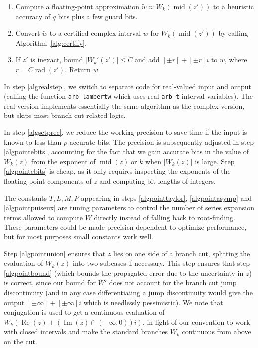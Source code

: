 \documentclass[11pt,a4paper]{article}
\begin{document}
\begin{algorithm}[h!]
\begin{enumerate}
\item Compute a floating-point approximation $\tilde w \approx W_k(\operatorname{mid}(z'))$ to a heuristic accuracy of $q$ bits plus a few guard bits.

\item Convert $\tilde w$ to a certified complex interval $w$ for $W_k(\operatorname{mid}(z'))$ by calling Algorithm~\ref{alg:certify}.

\item \label{algpointbound} If $z'$ is inexact, bound $|W_k'(z')| \le C$ and add $[\pm r] + [\pm r] i$ to $w$, where $r = C \operatorname{rad}(z')$. Return $w$.
\end{enumerate}
\label{alg:main}
\end{algorithm}

In step \ref{algrealstep}, we switch to separate code for real-valued
input and output (calling
the function \texttt{arb\_lambertw} which uses real \texttt{arb\_t}
interval variables).
The real version implements essentially the same algorithm
as the complex version,
but skips most branch cut related logic.

In step \ref{algsetprec}, we reduce the working precision
to save time if the input is known to less than $p$ accurate bits.
The precision is subsequently adjusted in step \ref{algpointebits},
accounting for the fact that we gain accurate
bits in the value of $W_k(z)$ from the exponent of $\operatorname{mid}(z)$ or $k$ when $|W_k(z)|$ is large.
Step \ref{algpointebits} is cheap, as it only requires inspecting
the exponents of the floating-point components of $z$ and computing bit lengths of integers.

The constants $T, L, M, P$ appearing in steps \ref{algpointtaylor}, \ref{algpointasymp}
and \ref{algpointpuiseux} are tuning
parameters to control the number of series expansion terms allowed to compute
$W$ directly instead of falling back to root-finding.
These parameters could be made precision-dependent to optimize performance,
but for most purposes small constants work well.

Step \ref{algpointunion} ensures that $z$ lies on one side of a branch cut,
splitting the evaluation of $W_k(z)$ into two subcases if necessary.
This step ensures that step \ref{algpointbound} (which bounds
the propagated error due to the uncertainty in $z$) is correct, since our bound
for $W'$ does not account for the branch cut jump discontinuity (and in any
case differentiating a jump discontinuity would give
the output $[\pm \infty] + [\pm \infty] i$ which is needlessly pessimistic).
We note that conjugation is used to get a continuous evaluation of 
$W_{k}(\operatorname{Re}(z) + (\operatorname{Im}(z) \cap (-\infty,0))i)$, in light of our convention
to work with closed intervals and make the standard branches $W_k$ continuous from above on the cut.
\end{document}
